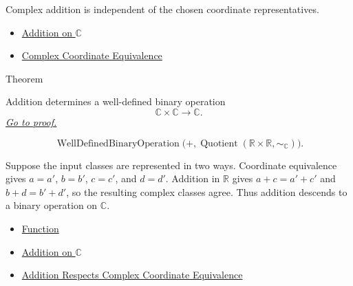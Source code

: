 \begin{remark*}[Interpretation]
Complex addition is independent of the chosen coordinate representatives.
\end{remark*}

\begin{dependencies}
\begin{itemize}
  \item \hyperref[def:addition-on-c-classes]{Addition on $\mathbb{C}$}
  \item \hyperref[def:complex-coordinate-equivalence]{Complex Coordinate Equivalence}
\end{itemize}
\end{dependencies}

\begin{theorembox}{Theorem}
\begin{theorem}
\label{thm:addition-on-c-well-defined}
Addition determines a well-defined binary operation
\[
\mathbb{C}\times\mathbb{C}\to\mathbb{C}.
\]
\hyperref[prf:addition-on-c-well-defined]{\textit{Go to proof.}}
\end{theorem}
\end{theorembox}

\begin{remark*}
\[
\operatorname{WellDefinedBinaryOperation}
\bigl(+, \operatorname{Quotient}(\mathbb{R}\times\mathbb{R},\sim_{\mathbb{C}})\bigr).
\]
\end{remark*}

\begin{remark*}[Interpretation]
Suppose the input classes are represented in two ways. Coordinate equivalence
gives \(a=a'\), \(b=b'\), 
\(c=c'\), and \(d=d'\). Addition in
\(\mathbb{R}\) gives \(a+c=a'+c'\) and \(b+d=b'+d'\), so the resulting
complex classes agree. Thus addition descends to a binary operation on
$\mathbb{C}$.
\end{remark*}

\begin{dependencies}
\begin{itemize}
  \item \hyperref[def:function]{Function}
  \item \hyperref[def:addition-on-c-classes]{Addition on $\mathbb{C}$}
  \item \hyperref[lem:addition-on-c-respects-equivalence]{Addition Respects Complex Coordinate Equivalence}
\end{itemize}
\end{dependencies}


